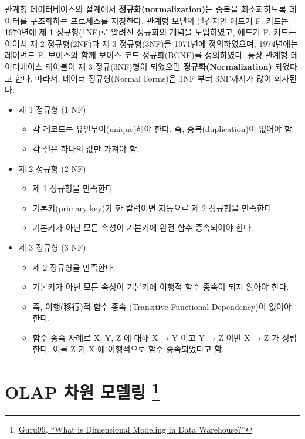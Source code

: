 \documentclass[
  letterpaper,
  chapter,a4paper,showtrims,openright,hidelinks]{oblivoir}
\providecommand{\tightlist}{%
  \setlength{\itemsep}{0pt}\setlength{\parskip}{0pt}}\usepackage{longtable,booktabs,array}
\begin{document}
관계형 데이터베이스의 설계에서 \textbf{정규화(normalization)}는 중복을
최소화하도록 데이터를 구조화하는 프로세스를 지칭한다. 관계형 모델의
발견자인 에드거 F. 커드는 1970년에 제 1 정규형(1NF)로 알려진 정규화의
개념을 도입하였고, 에드거 F. 커드는 이어서 제 2 정규형(2NF)과 제 3
정규형(3NF)을 1971년에 정의하였으며, 1974년에는 레이먼드 F. 보이스와
함께 보이스-코드 정규화(BCNF)를 정의하였다. 통상 관계형 데이터베이스
테이블이 제 3 정규(3NF)형이 되었으면 \textbf{정규화(Normalization)}
되었다고 한다. 따라서, 데이터 정규형(Normal Forms)은 1NF 부터 3NF까지가
많이 회자된다.

\begin{itemize}
\tightlist
\item
  제 1 정규형 (1 NF)

  \begin{itemize}
  \tightlist
  \item
    각 레코드는 유일무이(unique)해야 한다. 즉, 중복(duplication)이
    없어야 함.
  \item
    각 셀은 하나의 값만 가져야 함.
  \end{itemize}
\item
  제 2 정규형 (2 NF)

  \begin{itemize}
  \tightlist
  \item
    제 1 정규형을 만족한다.
  \item
    기본키(primary key)가 한 칼럼이면 자동으로 제 2 정규형을 만족한다.
  \item
    기본키가 아닌 모든 속성이 기본키에 완전 함수 종속되어야 한다.
  \end{itemize}
\item
  제 3 정규형 (3 NF)

  \begin{itemize}
  \tightlist
  \item
    제 2 정규형을 만족한다.
  \item
    기본키가 아닌 모든 속성이 기본키에 이행적 함수 종속이 되지 않아야
    한다.
  \item
    즉, 이행(移行)적 함수 종속 (Transitive Functional Dependency)이
    없어야 한다.
  \item
    함수 종속 사례로 X, Y, Z 에 대해 X → Y 이고 Y → Z 이면 X → Z 가
    성립한다. 이를 Z 가 X 에 이행적으로 함수 종속되었다고 함.
  \end{itemize}
\end{itemize}

\hypertarget{dimensional-modeling}{%
\section[OLAP 차원 모델링 ]{\texorpdfstring{OLAP 차원 모델링
\footnote{\href{https://www.guru99.com/dimensional-model-data-warehouse.html}{Guru99,
  ``What is Dimensional Modeling in Data Warehouse?''}}}{OLAP 차원 모델링 }}\label{dimensional-modeling}}
\end{document}
